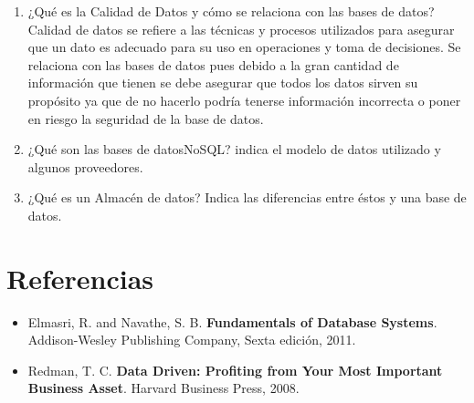 \documentclass{article}
\begin{document}
          \begin{enumerate}

          \item ¿Qué es la Calidad de Datos y cómo se relaciona con las bases de datos?\\
	 Calidad de datos se refiere a las técnicas y procesos utilizados para asegurar que un dato es adecuado para su uso en operaciones y toma de decisiones. Se relaciona con las bases de datos pues debido a la gran cantidad de información que tienen se debe asegurar que todos los datos sirven su propósito ya que de no hacerlo podría tenerse información incorrecta o poner en riesgo la seguridad de la base de datos.
          \item ¿Qué son las bases de datosNoSQL? indica el modelo de datos utilizado y algunos proveedores.
          \item ¿Qué es un Almacén de datos? Indica las diferencias entre éstos y una base de datos.

          \end{enumerate}

	\section*{Referencias}

	\begin{itemize}

		\item Elmasri, R. and Navathe, S. B. \textbf{Fundamentals of Database Systems}. Addison-Wesley Publishing Company, Sexta edición, 2011.
		\item Redman, T. C. \textbf{Data Driven: Profiting from Your Most Important Business Asset}. Harvard Business Press, 2008.

	\end{itemize}

    
\end{document}
